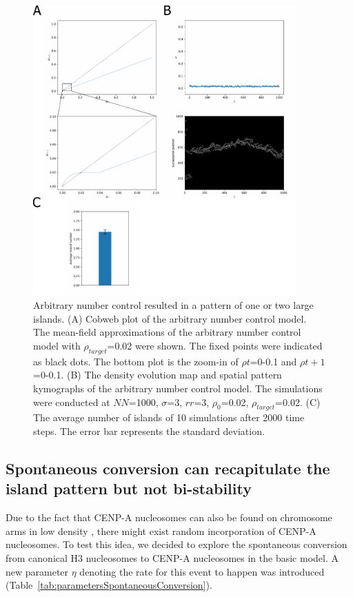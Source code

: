 \begin{figure}[htbp]
  \centering
  \includegraphics[width=0.9\textwidth]{chapter2/figures/number_conrol.pdf}
  \caption[Arbitrary number control resulted in a pattern of one or two large islands]{Arbitrary number control resulted in a pattern of one or two large islands. (A) Cobweb plot of the arbitrary number control model. The mean-field approximations of the arbitrary number control model with $\rho_{target}$=0.02 were shown. The fixed points were indicated as black dots. The bottom plot is the zoom-in of $\rho{t}$=0-0.1 and $\rho{t+1}$=0-0.1. (B) The density evolution map and spatial pattern kymographs of the arbitrary number control model. The simulations were conducted at $NN$=1000, $\sigma$=3, $rr$=3, $\rho_{0}$=0.02, $\rho_{target}$=0.02. (C) The average number of islands of 10 simulations after 2000 time steps. The error bar represents the standard deviation.}
  \label{fig:numberControl}
\end{figure}

\subsection{Spontaneous conversion can recapitulate the island pattern but not bi-stability}

Due to the fact that CENP-A nucleosomes can also be found on chromosome arms in low density \citep{Bodor2014}, there might exist random incorporation of CENP-A nucleosomes. To test this idea, we decided to explore the spontaneous conversion from canonical H3 nucleosomes to CENP-A nucleosomes in the basic model. A new parameter $\eta$ denoting the rate for this event to happen was introduced (Table~\ref{tab:parametersSpontaneousConversion}). 

